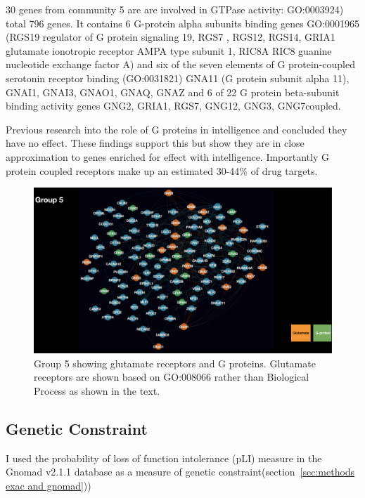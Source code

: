 30 genes from community 5 are are involved in GTPase activity: GO:0003924) total 796 genes. It contains 6 G-protein alpha subunits binding genes GO:0001965 (RGS19 regulator of G protein signaling 19, RGS7 , RGS12, RGS14, GRIA1 glutamate ionotropic receptor AMPA type subunit 1,  RIC8A RIC8 guanine nucleotide exchange factor A) and six of the seven elements of G protein-coupled serotonin receptor binding (GO:0031821) GNA11 (G protein subunit alpha 11), GNAI1, GNAI3, GNAO1, GNAQ, GNAZ and 6 of 22 G protein beta-subunit binding activity genes GNG2, GRIA1, RGS7, GNG12, GNG3, GNG7coupled.

Previous research into the role of G proteins in intelligence and concluded they have no effect\cite{hill2014functional}. These findings support this but show they are in close approximation to genes enriched for effect with intelligence. Importantly G protein coupled receptors make up an estimated 30-44\% of drug targets\cite{bull2015properties}. 


\begin{figure}
    \centering
    \includegraphics[width=\textwidth]{images/chapter_community_detection/mac/group5.png}
    \caption{Group 5 showing glutamate receptors and G proteins. Glutamate receptors are shown based on GO:008066 rather than Biological Process as shown in the text.}
    \label{fig:group 5}
\end{figure}
 
\subsection{Genetic Constraint}
I used the probability of loss of function intolerance (pLI) measure in the  Gnomad v2.1.1 database as a measure of genetic constraint(section~\ref{sec:methods exac and gnomad})) 

